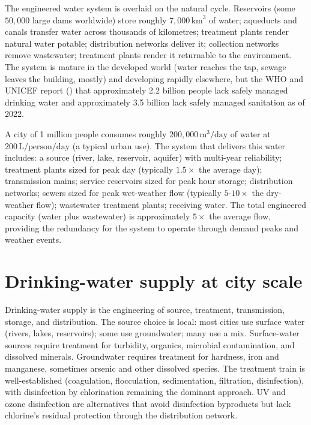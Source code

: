 The engineered water system is overlaid on the natural cycle. Reservoirs (some $50{,}000$ large dams worldwide) store roughly $7{,}000\,\text{km}^3$ of water; aqueducts and canals transfer water across thousands of kilometres; treatment plants render natural water potable; distribution networks deliver it; collection networks remove wastewater; treatment plants render it returnable to the environment. The system is mature in the developed world (water reaches the tap, sewage leaves the building, mostly) and developing rapidly elsewhere, but the WHO and UNICEF report (\cite{web:who-unicef-jmp-2023}) that approximately 2.2 billion people lack safely managed drinking water and approximately 3.5 billion lack safely managed sanitation as of 2022.

\begin{archetype}
A city of 1 million people consumes roughly $200{,}000\,\text{m}^3/\text{day}$ of water at $200\,\text{L/person/day}$ (a typical urban use). The system that delivers this water includes: a source (river, lake, reservoir, aquifer) with multi-year reliability; treatment plants sized for peak day (typically $1.5\times$ the average day); transmission mains; service reservoirs sized for peak hour storage; distribution networks; sewers sized for peak wet-weather flow (typically $5$-$10\times$ the dry-weather flow); wastewater treatment plants; receiving water. The total engineered capacity (water plus wastewater) is approximately $5\times$ the average flow, providing the redundancy for the system to operate through demand peaks and weather events.
\end{archetype}

\section{Drinking-water supply at city scale}

Drinking-water supply is the engineering of source, treatment, transmission, storage, and distribution. The source choice is local: most cities use surface water (rivers, lakes, reservoirs); some use groundwater; many use a mix. Surface-water sources require treatment for turbidity, organics, microbial contamination, and dissolved minerals. Groundwater requires treatment for hardness, iron and manganese, sometimes arsenic and other dissolved species. The treatment train is well-established (coagulation, flocculation, sedimentation, filtration, disinfection), with disinfection by chlorination remaining the dominant approach. UV and ozone disinfection are alternatives that avoid disinfection byproducts but lack chlorine's residual protection through the distribution network.

